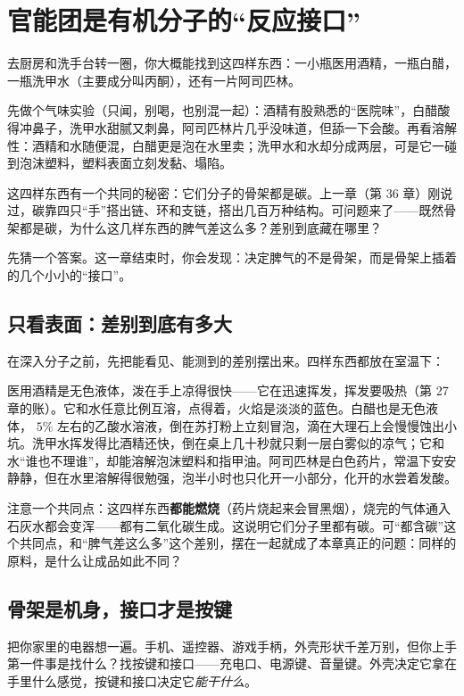 \chapter{官能团是有机分子的“反应接口”}

\begin{kaichang}
去厨房和洗手台转一圈，你大概能找到这四样东西：一小瓶医用酒精，一瓶白醋，一瓶洗甲水（主要成分叫丙酮），还有一片阿司匹林。

先做个气味实验（只闻，别喝，也别混一起）：酒精有股熟悉的“医院味”，白醋酸得冲鼻子，洗甲水甜腻又刺鼻，阿司匹林片几乎没味道，但舔一下会酸。再看溶解性：酒精和水随便混，白醋更是泡在水里卖；洗甲水和水却分成两层，可是它一碰到泡沫塑料，塑料表面立刻发黏、塌陷。

这四样东西有一个共同的秘密：它们分子的骨架都是碳。上一章（第 36 章）刚说过，碳靠四只“手”搭出链、环和支链，搭出几百万种结构。可问题来了——既然骨架都是碳，为什么这几样东西的脾气差这么多？差别到底藏在哪里？

先猜一个答案。这一章结束时，你会发现：决定脾气的不是骨架，而是骨架上插着的几个小小的“接口”。
\end{kaichang}

\section{只看表面：差别到底有多大}

在深入分子之前，先把能看见、能测到的差别摆出来。四样东西都放在室温下：

医用酒精是无色液体，泼在手上凉得很快——它在迅速挥发，挥发要吸热（第 27 章的账）。它和水任意比例互溶，点得着，火焰是淡淡的蓝色。白醋也是无色液体， $5\%$ 左右的乙酸水溶液，倒在苏打粉上立刻冒泡，滴在大理石上会慢慢蚀出小坑。洗甲水挥发得比酒精还快，倒在桌上几十秒就只剩一层白雾似的凉气；它和水“谁也不理谁”，却能溶解泡沫塑料和指甲油。阿司匹林是白色药片，常温下安安静静，但在水里溶解得很勉强，泡半小时也只化开一小部分，化开的水尝着发酸。

注意一个共同点：这四样东西\textbf{都能燃烧}（药片烧起来会冒黑烟），烧完的气体通入石灰水都会变浑——都有二氧化碳生成。这说明它们分子里都有碳。可“都含碳”这个共同点，和“脾气差这么多”这个差别，摆在一起就成了本章真正的问题：同样的原料，是什么让成品如此不同？

\section{骨架是机身，接口才是按键}

把你家里的电器想一遍。手机、遥控器、游戏手柄，外壳形状千差万别，但你上手第一件事是找什么？找按键和接口——充电口、电源键、音量键。外壳决定它拿在手里什么感觉，按键和接口决定它\emph{能干什么}。

